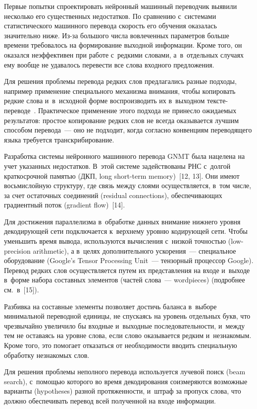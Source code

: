 \begin{multicols}{2}
  Первые попытки спроектировать нейронный машинный переводчик выявили 
несколько его существенных недостатков. По сравнению с~системами 
статистического машинного перевода скорость его обучения оказалась 
значительно ниже. Из-за большого числа вовлеченных параметров больше 
времени требовалось на формирование выходной информации. Кроме того, он 
оказался неэффективен при работе с~редкими словами, а~в~отдельных случаях 
ему вообще не удавалось перевести все слова входного предложения.

 Для 
решения проб\-ле\-мы перевода редких слов предлагались разные подходы, 
например применение специального механизма внимания, чтобы копировать 
редкие слова и~в~исходной форме воспроизводить их в~выходном 
текс\-те-пе\-ре\-во\-де~\cite{11-nur}. Практическое применение этого подхода не принесло 
ожидаемых результатов: простое копирование редких слов не всегда 
оказывается лучшим способом перевода~--- оно не подходит, когда согласно 
конвенциям переводящего языка требуется транскрибирование.
  
  Разработка системы нейронного машинного перевода GNMT была нацелена 
на учет указанных недостатков. В~этой системе задействованы 
РНС с~долгой краткосрочной памятью  (ДКП, long short-term 
memory)~[12, 13]. Они имеют восьмислойную структуру, где связь между 
слоями осуществляется, в~том числе, за счет остаточных соединений (residual 
connections), обеспечивающих градиентный поток (gradient flow)~[14]. 

Для 
достижения параллелизма в~обработке данных внимание нижнего уровня 
декодирующей сети подключается к~верхнему уровню кодирующей сети. 
Чтобы уменьшить время вывода, используются вычисления с~низкой точностью 
(low-precision arithmetic), а в~целях дополнительного ускорения~--- специальное 
оборудование (Google's Tensor Processing Unit~--- тензорный процессор 
Google). Перевод редких слов осуществляется путем их представления на входе и~выходе в~форме набора составных элементов (частей слова~--- wordpieces) 
(подробнее см.\ в~[15]). 

Разбивка на составные элементы позволяет достичь 
баланса в~выборе минимальной переводной единицы, не спускаясь на уровень 
отдельных букв, что чрезвычайно увеличило бы входные и~выходные 
последовательности, и~между тем не оставаясь на уровне слова, если слово 
оказывается редким и~незнакомым. Кроме того, это помогает отказаться от 
необходимости вводить специальную обработку незнакомых слов. 

Для решения 
проблемы неполного перевода используется лучевой поиск (beam search), 
с~по\-мощью которого во время декодирования соизмеряются возможные 
варианты (hypotheses) разной протяженности, и~штраф за пропуск слова, что 
должно обеспечивать перевод всей полученной на входе информации.
  

\end{multicols}
